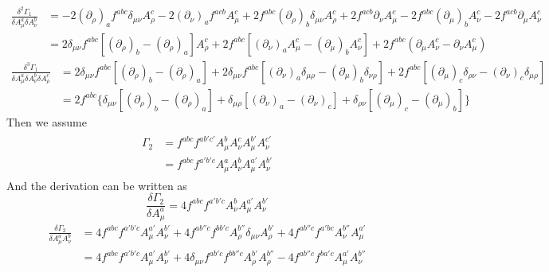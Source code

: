 \documentclass[UTF8]{article}
\begin{document}
\begin{equation}
\begin{split}
\frac{\delta^2\Gamma_1}{\delta A^{a}_{\mu}\delta A^{b}_{\nu}}&=-2(\partial_\rho)_af^{abc}\delta_{\mu\nu}A^{c}_{\rho}-2(\partial_\nu)_af^{acb}A^{c}_{\mu}
+2f^{abc}(\partial_\rho)_b\delta_{\mu\nu}A^{c}_{\rho}+2f^{acb}\partial_\nu A^{c}_{\mu}-2f^{abc}(\partial_\mu)_bA^{c}_{\nu}-2f^{acb}\partial_\mu A^{c}_{\nu}\\
&=2\delta_{\mu\nu}f^{abc}[(\partial_\rho)_b-(\partial_\rho)_a]A^{c}_{\rho}+2f^{abc}[(\partial_\nu)_aA^{c}_{\mu}-(\partial_\mu)_bA^{c}_{\nu}]+2f^{abc}
(\partial_\mu A^{c}_{\nu}-\partial_\nu A^{c}_{\mu})
\end{split}
\end{equation}
\begin{equation}
\begin{split}
\frac{\delta^3\Gamma_1}{\delta A^{a}_{\mu}\delta A^{b}_{\nu}\delta A^{c}_{\rho}}&=2\delta_{\mu\nu}f^{abc}[(\partial_\rho)_b-(\partial_\rho)_a]+2\delta_{\mu\nu}f^{abc}[(\partial_\nu)_a \delta_{\mu\rho}-(\partial_\mu)_b \delta_{\nu\rho}]+2f^{abc}[(\partial_\mu)_c \delta_{\rho\nu}-(\partial_\nu)_c \delta_{\mu\rho}]\\
&=2f^{abc}\bigg\{\delta_{\mu\nu}[(\partial_\rho)_b-(\partial_\rho)_a]+\delta_{\mu\rho}[(\partial_\nu)_a-(\partial_\nu)_c]+\delta_{\rho\nu}[(\partial_\mu)_c-(\partial_\mu)_b]\bigg\}
\end{split}
\end{equation}
Then we assume
\begin{align}
\begin{split}
\Gamma_2&=f^{abc}f^{ab'c'}A^b_\mu A^c_\nu A^{b'}_\mu A^{c'}_\nu\\
&=f^{abc}f^{a'b'c}A^a_\mu A^b_\nu A^{a'}_\mu A^{b'}_\nu
\end{split}
\end{align}
And the derivation can be written as
\begin{equation}
\frac{\delta\Gamma_2}{\delta A^a_\mu}=4f^{abc}f^{a'b'c}A^b_\nu A^{a'}_\mu A^{b'}_\nu
\end{equation}
\begin{equation}
\begin{split}
	\frac{\delta\Gamma_2}{\delta A^a_\mu A^b_\nu}&=4f^{abc}f^{a'b'c}A^{a'}_\mu A^{b'}_\nu+4f^{ab''c}f^{bb'c}A^{b''}_\rho \delta_{\mu\nu}A^{b'}_\rho+4f^{ab''c}f^{a'bc}A^{b''}_\nu A^{a'}_\mu\\
&=4f^{abc}f^{a'b'c}A^{a'}_\mu A^{b'}_\nu+4\delta_{\mu\nu}f^{ab'c}f^{bb''c}A^{b'}_\rho A^{b''}_\rho -4f^{ab''c}f^{ba'c}A^{a'}_\mu A^{b''}_\nu
\end{split}
\end{equation}
\end{document}
